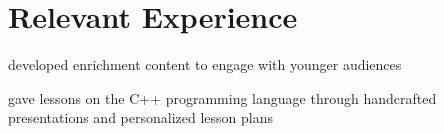 \section{Relevant Experience}

\vspace{\topsep} 
\begin{tightemize}
    \item developed enrichment content to engage with younger audiences 
    \item gave lessons on the C++ programming language through handcrafted presentations and personalized lesson plans
\end{tightemize}
